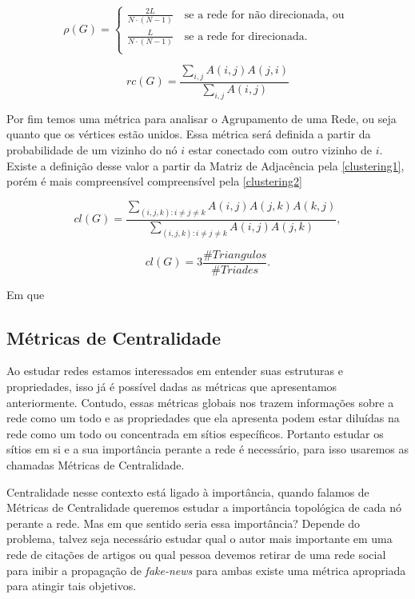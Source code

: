 \documentclass[12pt]{abnt-fisica11}%
\begin{document}
\[   
  \rho(G) = 
     \begin{cases}
      \frac{2L}{N\cdot(N-1)} \quad \text{se a rede for não direcionada, ou }\\
      \frac{L}{N\cdot(N-1)} \quad \text{se a rede for direcionada.} \\
     \end{cases}
\]

\begin{equation}
  rc(G) = \frac{\sum_{i,j} A(i,j)A(j,i)}{\sum_{i,j} A(i,j)}
\end{equation}

Por fim temos uma métrica para analisar o Agrupamento de uma Rede, ou seja quanto que os vértices estão unidos. Essa métrica será definida a partir da probabilidade de um vizinho do nó $i$ estar conectado com outro vizinho de $i$. Existe a definição desse valor a partir da Matriz de Adjacência pela \ref{clustering1}, porém é mais compreensível compreensível pela \ref{clustering2}

\begin{equation}
  cl(G) = \frac{\sum_{(i,j,k): i\neq j \neq k}A(i,j)A(j,k)A(k,j)}{\sum_{(i,j,k): i\neq j \neq k}A(i,j)A(j,k)},
  \label{clustering1}
\end{equation}

\begin{equation}
  cl(G) = 3\frac{\#Triangulos}{\#Triades}.
  \label{clustering2}
\end{equation}

Em que 

\subsection{Métricas de Centralidade}

Ao estudar redes estamos interessados em entender suas estruturas e propriedades, isso já é possível dadas as métricas que apresentamos anteriormente. Contudo, essas métricas globais nos trazem informações sobre a rede como um todo e as propriedades que ela apresenta podem estar diluídas na rede como um todo ou concentrada em sítios específicos. Portanto estudar os sítios em si e a sua importância perante a rede é necessário, para isso usaremos as chamadas Métricas de Centralidade.

Centralidade nesse contexto está ligado à importância, quando falamos de Métricas de Centralidade queremos estudar a importância topológica de cada nó perante a rede. Mas em que sentido seria essa importância? Depende do problema, talvez seja necessário estudar qual o autor mais importante em uma rede de citações de artigos ou qual pessoa devemos retirar de uma rede social para inibir a propagação de \textit{fake-news} para ambas existe uma métrica apropriada para atingir tais objetivos.
\end{document}
